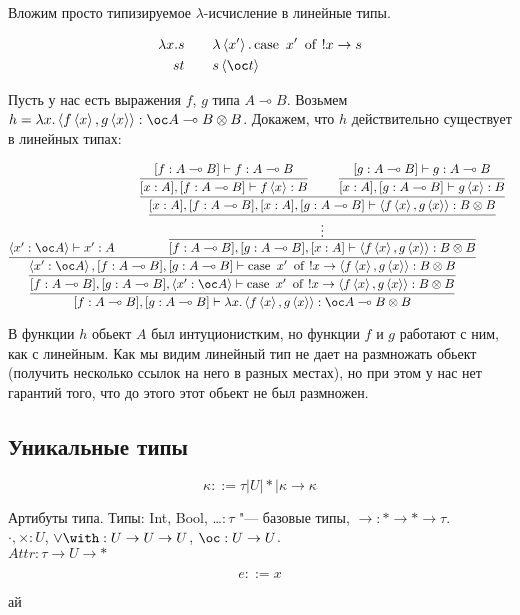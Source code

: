 Вложим просто типизируемое $\lambda$-исчисление в линейные типы.
\begin{bnf}
\begin{alignat*}{2}
	\lambda x.s & \qquad \lambda\pair{x'}.\caseb{x'}{!x \rightarrow s} \\
	st          & \qquad s\pair{\oc t}
\end{alignat*}
\end{bnf}
\begin{example}
	Пусть у нас есть выражения $f$, $g$  типа $A \multimap B$.
	Возьмем $h = \lambda x.\pair{f\pair{x}, g\pair{x}} : \oc A \multimap B \otimes B$.
	Докажем, что $h$ действительно существует в линейных типах:

	\[
		\infer[]{[f : A \multimap B], [g : A\multimap B]\vdash \lambda x.\pair{f\pair{x}, g\pair{x}} : \oc A \multimap B \otimes B}{
			\infer[]{
				[f : A \multimap B], [g : A \multimap B], \pair{x' : \oc A}
				\vdash \caseb{x'}{!x \rightarrow \pair{f\pair{x}, g\pair{x}} : B \otimes B}
			}{
				\infer[]{
					\pair{x' : \oc A}, [f : A \multimap B], [g : A \multimap B]
				\vdash \caseb{x'}{!x \rightarrow \pair{f\pair{x}, g\pair{x}} : B \otimes B}
				}{
					\pair{x' : \oc A} \vdash x' : A &&
					\infer[]{[f : A \multimap B], [g : A \multimap B], [x : A]\vdash \pair{f\pair{x}, g\pair{x}} : B \otimes B}{
						\infer[]{\vdots}{
						\infer[]{[x : A], [f : A \multimap B], [x : A], [g : A \multimap B]\vdash \pair{f\pair{x}, g\pair{x}} : B \otimes B}{
								\infer[]{[x : A], [f : A \multimap B]\vdash f\pair{x} : B}{[f : A \multimap B] \vdash f : A \multimap B}
								&&
								\infer[]{[x : A], [g : A \multimap B]\vdash g\pair{x} : B}{[g : A \multimap B] \vdash g : A \multimap B}
							}
						}
					}
				}
			}
		}
	\]

	В функции $h$ обьект $A$ был интуционистким, но функции $f$ и $g$ работают с ним, как с линейным.
	Как мы видим линейный тип не дает на размножать обьект (получить несколько ссылок на него в разных местах),
	но при этом у нас нет гарантий того, что до этого этот обьект не был размножен.
\end{example}

\subsection{\texorpdfstring{Уникальные типы}{Unique types}}

\begin{bnf}
\[
    \kappa ::= \tau | U | * | \kappa \rightarrow \kappa
\]
\end{bnf}

Артибуты типа.
Типы: Int, Bool, \ldots $: \tau$ "--- базовые типы, $\rightarrow : * \rightarrow * \rightarrow \tau$. \\
$\cdot, \times : U$, $\vee \with : U \rightarrow U \rightarrow U$, $\oc : U \rightarrow U$. \\
$Attr : \tau \rightarrow U \rightarrow *$

\begin{bnf}
\[
    e ::= x
\]
\end{bnf}

ай
